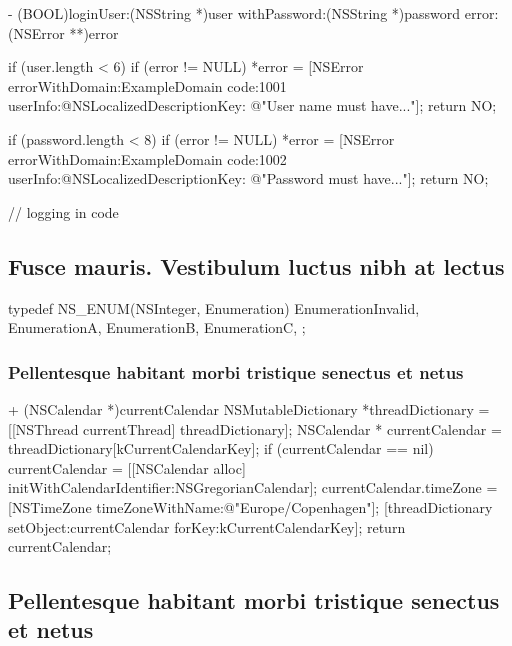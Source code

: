 \documentclass[10pt]{extarticle}
\newenvironment{codelisting}
{\footnotesize\mdframed[middlelinewidth=0.5pt, middlelinecolor=BaliHaiColor, skipabove=15pt]\verbatim}
{\endverbatim\endmdframed\vspace{12pt}\normalsize}
\begin{document}
\begin{codelisting}
- (BOOL)loginUser:(NSString *)user withPassword:(NSString *)password error:(NSError **)error
{
    if (user.length < 6) {
        if (error != NULL)
            *error = [NSError errorWithDomain:ExampleDomain
                                         code:1001
                                     userInfo:@{NSLocalizedDescriptionKey: @"User name must have..."}];
        return NO;
    }
   
    if (password.length < 8)
        if (error != NULL)
            *error = [NSError errorWithDomain:ExampleDomain
                                         code:1002
                                     userInfo:@{NSLocalizedDescriptionKey: @"Password must have..."}];
        return NO;
   
    // logging in code
}
\end{codelisting}

\subsection{Fusce mauris. Vestibulum luctus nibh at lectus}

\begin{codelisting}
typedef NS_ENUM(NSInteger, Enumeration) {
    EnumerationInvalid,
    EnumerationA,
    EnumerationB,
    EnumerationC,
};
\end{codelisting}

\subsubsection{Pellentesque habitant morbi tristique senectus et netus}

\begin{codelisting}
+ (NSCalendar *)currentCalendar
{
    NSMutableDictionary *threadDictionary = [[NSThread currentThread] threadDictionary];
    NSCalendar * currentCalendar = threadDictionary[kCurrentCalendarKey];
    if (currentCalendar == nil) {
        currentCalendar = [[NSCalendar alloc] initWithCalendarIdentifier:NSGregorianCalendar];
        currentCalendar.timeZone = [NSTimeZone timeZoneWithName:@"Europe/Copenhagen"];
        [threadDictionary setObject:currentCalendar forKey:kCurrentCalendarKey];
    }
    return currentCalendar;
}
\end{codelisting}

\subsection{Pellentesque habitant morbi tristique senectus et netus}
\end{document}
